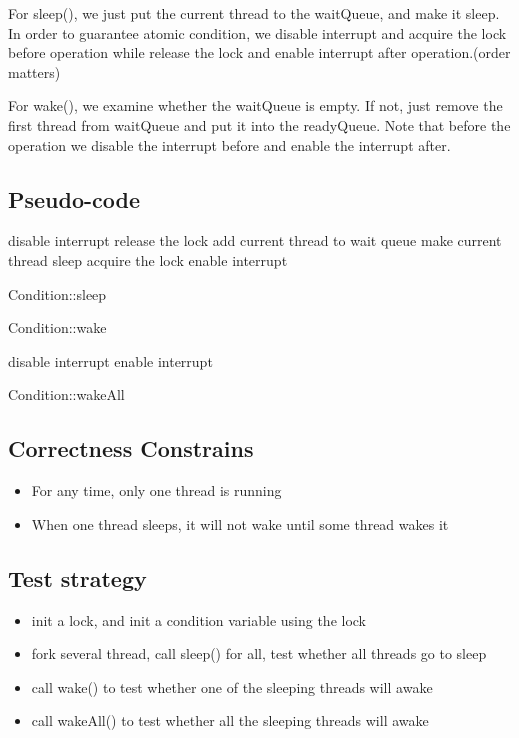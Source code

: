 \documentclass[a4paper,10pt]{article}
\begin{document}
For sleep(), we just put the current thread to the waitQueue, and make it sleep. In order to guarantee atomic condition, we disable interrupt and acquire the lock before operation while release the lock and enable interrupt after operation.(order matters)

For wake(), we examine whether the waitQueue is empty. If not, just remove the first thread from waitQueue and put it into the readyQueue. Note that before the operation we disable the interrupt before and enable the interrupt after.
\subsection {Pseudo-code}

\begin{algorithm}
\DontPrintSemicolon %
disable interrupt\;
release the lock\;
add current thread to wait queue\;
make current thread sleep\;
acquire the lock\;
enable interrupt
\caption{Condition::sleep}
\label{algo:sleep}
\end{algorithm}

\begin{algorithm}
\caption{Condition::wake}
\end{algorithm}

\begin{algorithm}
disable interrupt\;
enable interrupt\;
\caption{Condition::wakeAll}
\end{algorithm}
\subsection{Correctness Constrains}
\begin{itemize}
\item For any time, only one thread is running
\item When one thread sleeps, it will not wake until some thread wakes it
\end{itemize}

\subsection {Test strategy}
\begin{itemize}
\item init a lock, and init a condition variable using the lock
\item fork several thread, call sleep() for all, test whether all threads go to sleep
\item call wake() to test whether one of the sleeping threads will awake
\item call wakeAll() to test whether all the sleeping threads will awake
\end{itemize}
\end{document}
